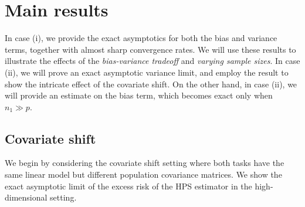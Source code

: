 \section{Main results}

In case (i), we provide the exact asymptotics for both the bias and variance terms, together with almost sharp convergence rates. We will use these results to illustrate the effects of the \emph{bias-variance tradeoff} and \emph{varying sample sizes}. In case (ii), we will prove an exact asymptotic variance limit, and employ the result to show the intricate effect of the covariate shift. On the other hand, in case (ii), we will provide an estimate on the bias term, which becomes exact only when $n_1\gg p$. %


\subsection{Covariate shift}\label{sec_diff}

We begin by considering the covariate shift setting where both tasks have the same linear model but different population covariance matrices.
We show the exact asymptotic limit of the excess risk of the HPS estimator in the high-dimensional setting.

